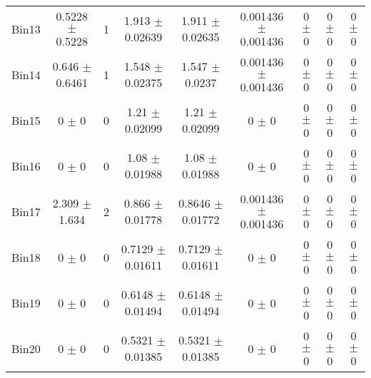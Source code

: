 \begin{tabular}{@{\extracolsep{4pt}}lcccccccc@{}}
     Bin13 & 0.5228 $\pm$ 0.5228 & 1 & 1.913 $\pm$ 0.02639 & 1.911 $\pm$ 0.02635 & 0.001436 $\pm$ 0.001436 & 0 $\pm$ 0 & 0 $\pm$ 0 & 0 $\pm$ 0 \\ 
     Bin14 & 0.646 $\pm$ 0.6461 & 1 & 1.548 $\pm$ 0.02375 & 1.547 $\pm$ 0.0237 & 0.001436 $\pm$ 0.001436 & 0 $\pm$ 0 & 0 $\pm$ 0 & 0 $\pm$ 0 \\ 
     Bin15 & 0 $\pm$ 0 & 0 & 1.21 $\pm$ 0.02099 & 1.21 $\pm$ 0.02099 & 0 $\pm$ 0 & 0 $\pm$ 0 & 0 $\pm$ 0 & 0 $\pm$ 0 \\ 
     Bin16 & 0 $\pm$ 0 & 0 & 1.08 $\pm$ 0.01988 & 1.08 $\pm$ 0.01988 & 0 $\pm$ 0 & 0 $\pm$ 0 & 0 $\pm$ 0 & 0 $\pm$ 0 \\ 
     Bin17 & 2.309 $\pm$ 1.634 & 2 & 0.866 $\pm$ 0.01778 & 0.8646 $\pm$ 0.01772 & 0.001436 $\pm$ 0.001436 & 0 $\pm$ 0 & 0 $\pm$ 0 & 0 $\pm$ 0 \\ 
     Bin18 & 0 $\pm$ 0 & 0 & 0.7129 $\pm$ 0.01611 & 0.7129 $\pm$ 0.01611 & 0 $\pm$ 0 & 0 $\pm$ 0 & 0 $\pm$ 0 & 0 $\pm$ 0 \\ 
     Bin19 & 0 $\pm$ 0 & 0 & 0.6148 $\pm$ 0.01494 & 0.6148 $\pm$ 0.01494 & 0 $\pm$ 0 & 0 $\pm$ 0 & 0 $\pm$ 0 & 0 $\pm$ 0 \\ 
     Bin20 & 0 $\pm$ 0 & 0 & 0.5321 $\pm$ 0.01385 & 0.5321 $\pm$ 0.01385 & 0 $\pm$ 0 & 0 $\pm$ 0 & 0 $\pm$ 0 & 0 $\pm$ 0 \\ 
\hline\hline
  \end{tabular}
